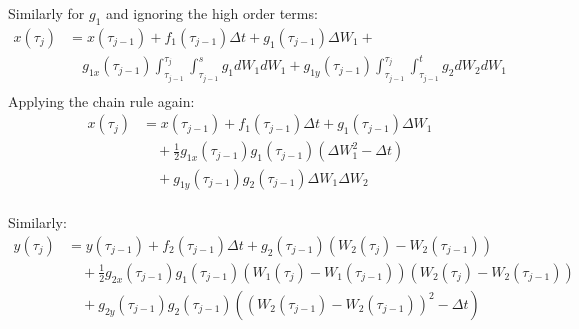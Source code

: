 \begin{frame}

Similarly for $g_1$ and ignoring the high order terms:
	\begin{equation*}
	\begin{split}
	x(\tau_{j})&=x(\tau_{j-1})+f_1(\tau_{j-1})\Delta t+g_1(\tau_{j-1})\Delta W_1+\\
	&\quad g_{1x}(\tau_{j-1})\int_{\tau_{j-1}}^{\tau_{j}}\int_{\tau_{j-1}}^{s}g_1dW_1dW_1 +g_{1y}(\tau_{j-1})\int_{\tau_{j-1}}^{\tau_{j}}\int_{\tau_{j-1}}^{t} 		    g_2dW_2dW_1\\
	\end{split}
	\end{equation*}
Applying the chain rule again:
	\begin{equation*}
	\begin{split}
	x(\tau_{j})&=x(\tau_{j-1})+f_1(\tau_{j-1})\Delta t+g_1(\tau_{j-1})\Delta W_1\\
	&\quad +\frac{1}{2}g_{1x}(\tau_{j-1})g_{1}(\tau_{j-1})(\Delta W_1^2-\Delta t)\\
	&\quad +g_{1y}(\tau_{j-1})g_2(\tau_{j-1})\Delta W_1 \Delta W_2\\
	\end{split}
	\end{equation*}
\end{frame}

\begin{frame}
Similarly:
\begin{equation*}
	\begin{split}
	y(\tau_{j})&=y(\tau_{j-1})+f_2(\tau_{j-1})\Delta t+g_2(\tau_{j-1})(W_2(\tau_{j})-W_2(\tau_{j-1}))\\
	&\quad +\frac{1}{2}g_{2x}(\tau_{j-1})g_{1}(\tau_{j-1})(W_1(\tau_{j})-W_1(\tau_{j-1}))(W_2(\tau_{j})-W_2(\tau_{j-1}))\\
	&\quad +g_{2y}(\tau_{j-1})g_2(\tau_{j-1})((W_2(\tau_{j-1})-W_2(\tau_{j-1}))^2-\Delta t)\\
	\end{split}
	\end{equation*}
\end{frame}




